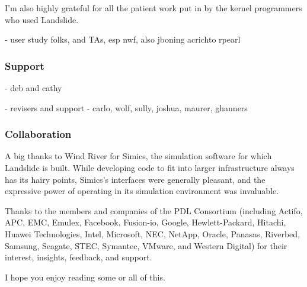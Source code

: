 I'm also highly grateful for all the patient work put in by the kernel programmers who used Landslide.

- user study folks, and TAs, esp nwf, also jboning acrichto rpearl

\subsubsection{Support}

- deb and cathy

- revisers and support - carlo, wolf, sully, joshua, maurer, ghanners

\subsubsection{Collaboration}

A big thanks to Wind River for Simics, the simulation software for which Landslide is built. While developing code to fit into larger infrastructure always has its hairy points, Simics's interfaces were generally pleasant, and the expressive power of operating in its simulation environment was invaluable.

Thanks to the members and companies of the PDL Consortium (including Actifo,
APC, EMC, Emulex, Facebook, Fusion-io, Google, Hewlett-Packard, Hitachi, Huawei
Technologies, Intel, Microsoft, NEC, NetApp, Oracle, Panasas, Riverbed,
Samsung, Seagate, STEC, Symantec, VMware, and Western Digital) for their
interest, insights, feedback, and support.

I hope you enjoy reading some or all of this.
